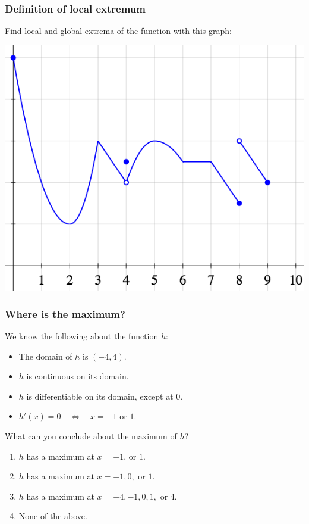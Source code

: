\documentclass[14pt]{beamer}
\date{}
\title{}
\author{}
\newcommand {\DS} [1] {${\displaystyle #1}$}
\begin{document}

\begin{frame}
\frametitle{Definition of local extremum}

Find local and global extrema of the function with this graph:

\begin{center}
\includegraphics[scale=.42]{G13}
\end{center}

\end{frame}
\begin{frame}[t]
\frametitle{Where is the maximum?}

We know the following about the function $h$:
	\begin{itemize}
		\item  The domain of $h$ is \DS{(-4,4)}.
		\item  $h$ is continuous on its domain.
		\item  $h$ is differentiable on its domain, except at $0$.
		\item  $h'(x) = 0 \quad \iff \quad x=-1 \mbox{ or } 1$.
	\end{itemize}
	
\begin{block}{What can you conclude about the maximum of $h$?}
\pause
	\begin{enumerate}
		\item  $h$ has a maximum at $x=-1$, or $1$.
		\item  $h$ has a maximum at $x=-1,0,$ or $1$.
		\item  $h$ has a maximum at $x=-4, -1,0, 1,$ or $4$.
		\item None of the above.	
	\end{enumerate}
\end{block}	


\end{frame}
\end{document}
